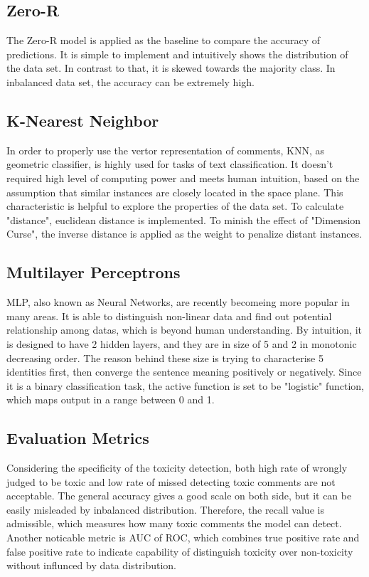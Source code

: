 \documentclass[11pt,twocolumn]{article}
\begin{document}
\subsection{Zero-R}
The Zero-R model is applied as the baseline to compare the accuracy of predictions. It is simple to implement and intuitively shows the distribution of the data set. In contrast to that, it is skewed towards the majority class. In inbalanced data set, the accuracy can be extremely high.

\subsection{K-Nearest Neighbor}
In order to properly use the vertor representation of comments, KNN, as geometric classifier, is highly used for tasks of text classification. It doesn't required high level of computing power and meets human intuition, based on the assumption that similar instances are closely located in the space plane. This characteristic is helpful to explore the properties of the data set.
To calculate "distance", euclidean distance is implemented. To minish the effect of "Dimension Curse", the inverse distance is applied as the weight to penalize distant instances.

\subsection{Multilayer Perceptrons}
MLP, also known as Neural Networks, are recently becomeing more popular in many areas. It is able to distinguish non-linear data and find out potential relationship among datas, which is beyond human understanding. By intuition, it is designed to have 2 hidden layers, and they are in size of 5 and 2 in monotonic decreasing order. The reason behind these size is trying to characterise 
5 identities first, then converge the sentence meaning positively or negatively. Since it is a binary classification task, the active function is set to be "logistic" function, which maps output in a range between 0 and 1. 

\subsection{Evaluation Metrics}
Considering the specificity of the toxicity detection, both high rate of wrongly judged to be toxic and low rate of missed detecting toxic comments are not acceptable. The general accuracy gives a good scale on both side, but it can be easily misleaded by inbalanced distribution. Therefore, the recall value is admissible, which measures how many toxic comments the model can detect.
Another noticable metric is AUC of ROC, which combines true positive rate and false positive rate to indicate capability of distinguish toxicity over non-toxicity without influnced by data distribution.
\end{document}
